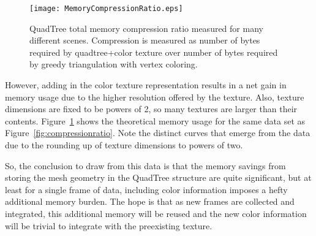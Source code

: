 \begin{figure}[!htpb]
    \centering
    \texttt{[image: MemoryCompressionRatio.eps]}
    \caption{QuadTree total memory compression ratio measured for many different scenes. Compression is measured as number of bytes required by quadtree+color texture over number of bytes required by greedy triangulation with vertex coloring.}
    \label{fig:memorycompressionratio}
\end{figure}

However, adding in the color texture representation results in a net gain in memory usage due to the higher resolution offered by the texture. Also, texture dimensions are fixed to be powers of 2, so many textures are larger than their contents. Figure~\ref{fig:memorycompressionratio} shows the theoretical memory usage for the same data set as Figure~\ref{fig:compressionratio}. Note the distinct curves that emerge from the data due to the rounding up of texture dimensions to powers of two.\par 
So, the conclusion to draw from this data is that the memory savings from storing the mesh geometry in the QuadTree structure are quite significant, but at least for a single frame of data, including color information imposes a hefty additional memory burden. The hope is that as new frames are collected and integrated, this additional memory will be reused and the new color information will be trivial to integrate with the preexisting texture.